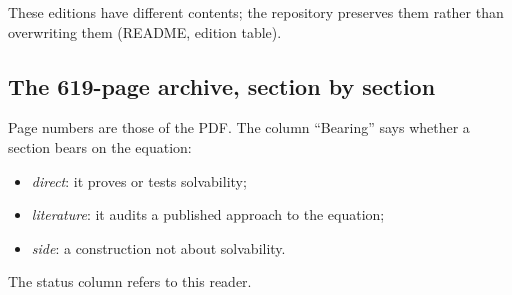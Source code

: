 These editions have different contents; the repository preserves them rather than overwriting them (README, edition table).

\subsection{The 619-page archive, section by section}\label{ssec:archive}

Page numbers are those of the PDF. The column ``Bearing'' says whether a section bears on the equation:
\begin{itemize}
\item \emph{direct}: it proves or tests solvability;
\item \emph{literature}: it audits a published approach to the equation;
\item \emph{side}: a construction not about solvability.
\end{itemize}
The status column refers to this reader.

